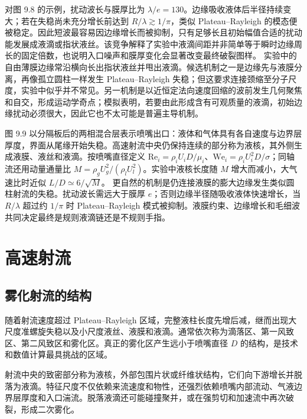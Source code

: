 \documentclass[11pt,a4paper,openany,fontset=none]{ctexbook}
\begin{document}
对图 9.8 的示例，扰动波长与膜厚比为 $\lambda/e=130$。边缘吸收液体后半径持续变大；若在失稳尚未充分增长前达到 $R/\lambda\gtrsim1/\pi$，类似 Plateau--Rayleigh 的模态便被稳定。因此短波最容易因边缘增长而被抑制，只有足够长且初始幅值合适的扰动能发展成液滴或指状液丝。该竞争解释了实验中液滴间距并非简单等于瞬时边缘周长的固定倍数，也说明入口噪声和膜厚变化会显著改变最终破裂图样。
实验中的自由薄膜边缘常沿横向长出指状液丝并甩出液滴。候选机制之一是边缘先与液膜分离，再像孤立圆柱一样发生 Plateau--Rayleigh 失稳；但这要求连接颈缩至分子尺度，实验中似乎并不常见。另一机制是以近恒定法向速度回缩的波前发生几何聚焦和自交，形成运动学奇点；模拟表明，若要由此形成含有可观质量的液滴，初始边缘扰动必须很大，因此它也不太可能是普遍主导机制。

图 9.9 以分隔板后的两相混合层表示喷嘴出口：液体和气体具有各自速度与边界层厚度，界面从尾缘开始失稳。高速射流中央仍保持连续的部分称为液核，其外侧生成液膜、液丝和液滴。按喷嘴直径定义 $\mathrm{Re}_i=\rho_iU_iD/\mu_i$、$\mathrm{We}_i=\rho_iU_i^2D/\sigma$；同轴流还用动量通量比 $M=\rho_gU_g^2/(\rho_lU_l^2)$。实验中液核长度随 $M$ 增大而减小，大气速比时近似 $L/D\simeq6/\sqrt M$。
更自然的机制是仍连接液膜的膨大边缘发生类似圆柱射流的失稳。扰动波长需远大于膜厚 $e$；否则边缘半径随吸收液体快速增长，当 $R/\lambda$ 超过约 $1/\pi$ 时 Plateau--Rayleigh 模式被抑制。液膜约束、边缘增长和毛细波共同决定最终是规则液滴链还是不规则手指。

\section{高速射流}

\subsection{雾化射流的结构}

随着射流速度超过 Plateau--Rayleigh 区域，完整液柱长度先增后减，继而出现大尺度准螺旋失稳以及小尺度液丝、液膜和液滴。通常依次称为滴落区、第一风致区、第二风致区和雾化区。真正的雾化区产生远小于喷嘴直径 $D$ 的结构，是技术和数值计算最具挑战的区域。

射流中央的致密部分称为液核，外部包围片状或纤维状结构，它们向下游增长并脱落为液滴。特征尺度不仅依赖来流速度和物性，还强烈依赖喷嘴内部流动、气液边界层厚度和入口湍流。脱落液滴还可能碰撞聚并，或在强剪切和加速流中再次破裂，形成二次雾化。
\end{document}
